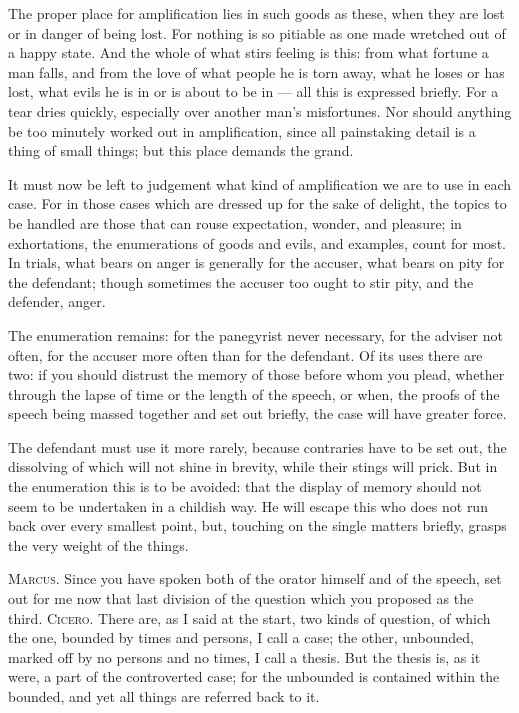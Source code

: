  The proper place for amplification lies in such goods as these, when they are lost or in danger of being lost. For nothing is so pitiable as one made wretched out of a happy state. And the whole of what stirs feeling is this: from what fortune a man falls, and from the love of what people he is torn away, what he loses or has lost, what evils he is in or is about to be in — all this is expressed briefly. For a tear dries quickly, especially over another man's misfortunes. Nor should anything be too minutely worked out in amplification, since all painstaking detail is a thing of small things; but this place demands the grand.

 It must now be left to judgement what kind of amplification we are to use in each case. For in those cases which are dressed up for the sake of delight, the topics to be handled are those that can rouse expectation, wonder, and pleasure; in exhortations, the enumerations of goods and evils, and examples, count for most. In trials, what bears on anger is generally for the accuser, what bears on pity for the defendant; though sometimes the accuser too ought to stir pity, and the defender, anger.

 The enumeration remains: for the panegyrist never necessary, for the adviser not often, for the accuser more often than for the defendant. Of its uses there are two: if you should distrust the memory of those before whom you plead, whether through the lapse of time or the length of the speech, or when, the proofs of the speech being massed together and set out briefly, the case will have greater force.

 The defendant must use it more rarely, because contraries have to be set out, the dissolving of which will not shine in brevity, while their stings will prick. But in the enumeration this is to be avoided: that the display of memory should not seem to be undertaken in a childish way. He will escape this who does not run back over every smallest point, but, touching on the single matters briefly, grasps the very weight of the things.

 \textsc{Marcus.} Since you have spoken both of the orator himself and of the speech, set out for me now that last division of the question which you proposed as the third. \textsc{Cicero.} There are, as I said at the start, two kinds of question, of which the one, bounded by times and persons, I call a case; the other, unbounded, marked off by no persons and no times, I call a thesis. But the thesis is, as it were, a part of the controverted case; for the unbounded is contained within the bounded, and yet all things are referred back to it.

